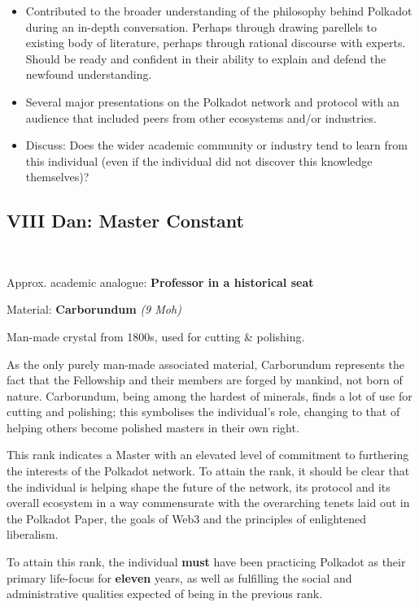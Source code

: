 \documentclass[9pt,oneside]{amsart}
\begin{document}
\begin{itemize}
\item Contributed to the broader understanding of the philosophy behind Polkadot during an in-depth conversation. Perhaps through drawing parellels to existing body of literature, perhaps through rational discourse with experts. Should be ready and confident in their ability to explain and defend the newfound understanding.
\item Several major presentations on the Polkadot network and protocol with an audience that included peers from other ecosystems and/or industries.
\item Discuss: Does the wider academic community or industry tend to learn from this individual (even if the individual did not discover this knowledge themselves)?
\end{itemize}

\subsection{VIII Dan: Master Constant}\label{viii-dan-master-constant}~\\


Approx. academic analogue: \textbf{Professor in a historical seat}

Material: \textbf{Carborundum} \emph{(9 Moh)}

Man-made crystal from 1800s, used for cutting \& polishing.

As the only purely man-made associated material, Carborundum represents the fact that the Fellowship and their members are forged by mankind, not born of nature. Carborundum, being among the hardest of minerals, finds a lot of use for cutting and polishing; this symbolises the individual's role, changing to that of helping others become polished masters in their own right.

This rank indicates a Master with an elevated level of commitment to furthering the interests of the Polkadot network. To attain the rank, it should be clear that the individual is helping shape the future of the network, its protocol and its overall ecosystem in a way commensurate with the overarching tenets laid out in the Polkadot Paper, the goals of Web3 and the principles of enlightened liberalism.

To attain this rank, the individual \textbf{must} have been practicing Polkadot as their primary life-focus for \textbf{eleven} years, as well as fulfilling the social and administrative qualities expected of being in the previous rank.
\end{document}
